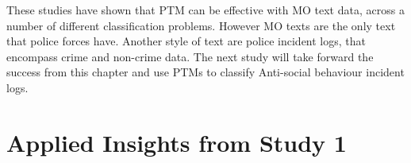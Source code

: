 These studies have shown that PTM can be effective with MO text data, across a number of different classification problems. However MO texts are the only text that police forces have. Another style of text are police incident logs, that encompass crime and non-crime data. The next study will take forward the success from this chapter and use PTMs to classify Anti-social behaviour incident logs.


\chapter{Applied Insights from Study 1}



